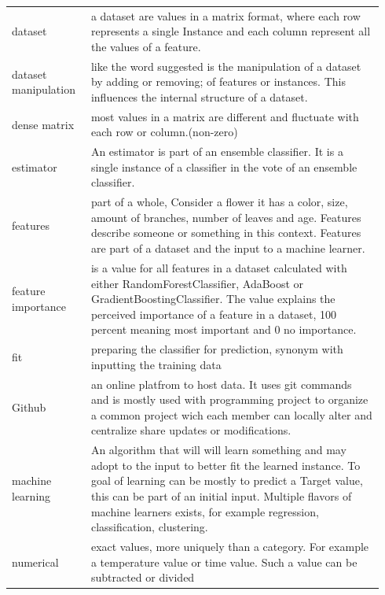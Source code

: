 \documentclass[a4paper,10pt]{article}
\begin{document}
\begin{tabular}{ p{0.20\linewidth} p{0.7437\linewidth} }
	dataset & a dataset are values in a matrix format, where each row represents a single Instance and each column represent all the values of a feature.\\ [1ex]
	
	dataset manipulation & like the word suggested is the manipulation of a dataset by adding or removing; of features or instances. This influences the internal structure of a dataset.  \\ [1ex]
	
	dense matrix & most values in a matrix are different and fluctuate with each row or column.(non-zero)\\ [1ex]
		
	estimator & An estimator is part of an ensemble classifier. It is a single instance of a classifier in the vote of an ensemble classifier.\\ [1ex]
	
	features & part of a whole, Consider a flower it has a color, size, amount of branches, number of leaves and age. Features describe someone or something in this context. Features are part of a dataset and the input to a machine learner.\\ [1ex]
	
	feature importance & is a value for all features in a dataset calculated with either RandomForestClassifier, AdaBoost or GradientBoostingClassifier. The value explains the perceived importance of a feature in a dataset, 100 percent meaning most important and 0 no importance.  \\ [1ex]
	
	fit & preparing the classifier for prediction, synonym with inputting the training data \\ [1ex]
	
	Github & an online platfrom to host data. It uses git commands and is mostly used with programming project to organize a common project wich each member can locally alter and centralize share updates or modifications. \\ [1ex]	
	
	machine learning & An algorithm that will will learn something and may adopt to the input to better fit the learned instance. To goal of learning can be mostly to predict a Target value, this can be part of an initial input. Multiple flavors of machine learners exists, for example regression, classification, clustering.\\ [1ex]	
	
	numerical & exact values, more uniquely than a category. For example a temperature value or time value. Such a value can be subtracted or divided \\ [1ex]	
\end{tabular}
\end{document}

